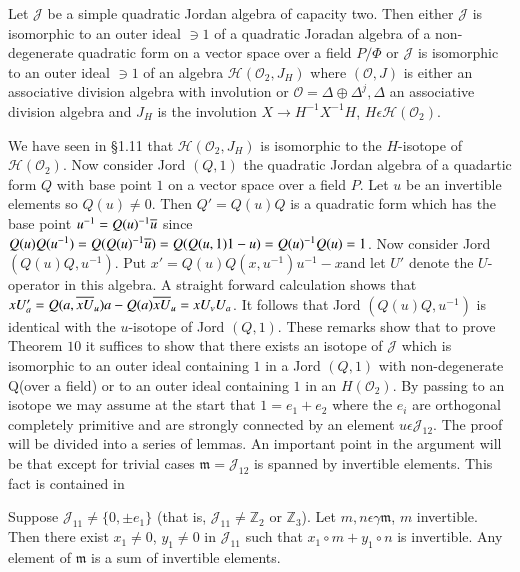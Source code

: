 \begin{thm}\label{c3:thm10}
Let $\mathscr{J}$ be a simple quadratic Jordan algebra of capacity
two. Then either $\mathscr{J}$ is isomorphic to an outer ideal $\ni 1$
of  a quadratic Joradan algebra of a non-degenerate quadratic form on
a vector space over a field $P/\Phi$ or $\mathscr{J}$ is isomorphic to
an outer ideal $\ni 1$ of an algebra $\mathscr{H}(\mathscr{O}_2,J_H)$
where $(\mathscr{O},J)$ is either an associative division algebra with
involution or $\mathscr{O}=\Delta\oplus \Delta^{j},\Delta$ an
associative division algebra and $J_H$ is the involution $X\to
H^{-1}X^{-1}H$, $H\epsilon\mathscr{H}(\mathscr{O}_2)$. 

We have seen in \S 1.11 that $\mathscr{H}(\mathscr{O}_2,J_H)$ is
isomorphic to the $H$-isotope of $\mathscr{H}(\mathscr{O}_2)$. Now
consider Jord $(Q,1)$ the quadratic Jordan algebra of a quadartic form
$Q $ with base point $1$ on a vector space over a field $P$. Let $u$
be an invertible elements so $Q(u)\neq 0$. Then $Q'=Q(u)Q$ is a
quadratic form which has the base point $u^{-1}=Q(u)^{-1}\overline{u}$ since
$Q(u)Q(u^{-1})=Q(Q(u)^{-1}\overline{u})=Q(Q(u,1)1-u)=Q(u)^{-1}Q(u)=1$. Now
consider Jord $(Q(u)Q,u^{-1})$. Put
$x'=Q(u)Q(x,u^{-1})u^{-1}-x$\pageoriginale and let $U'$ denote the
$U$-operator in this algebra. A straight forward calculation shows
that $xU'_a=Q(a,\overline{xU}_u)a-Q(a)\overline{xU}_u=xU_vU_a$. It follows that
Jord $(Q(u)Q,u^{-1})$ is identical with the $u$-isotope of Jord
$(Q,1)$. These remarks show that to prove Theorem $10$ it suffices to
show that there exists an isotope of $\mathscr{J}$ which is isomorphic
to an outer ideal containing $1$ in a Jord $(Q,1)$ with non-degenerate
Q(over a field) or to an outer ideal containing $1$ in an
$H(\mathscr{O}_2)$. By passing to an isotope we may assume at the
start that $1=e_1+e_2$ where the $e_i$ are orthogonal completely
primitive and are strongly connected by an element $u\epsilon
\mathscr{J}_{12}$. The proof will be divided into a series of
lemmas. An important point in the argument will be that except for
trivial cases $\mathfrak{m}=\mathscr{J}_{12}$ is spanned by invertible
elements. This fact is contained in 
\end{thm}

\setcounter{lemma}{0}
\begin{lemma}\label{c3:sec9:lem1}
  Suppose $\mathscr{J}_{11}\neq \{0, \pm e_1\}$ (that is,
  $\mathscr{J}_{11}\neq \mathbb{Z}_2$ or $\mathbb{Z}_3$). Let
  $m,n\epsilon \gamma \mathfrak{m}$, $m$ invertible. Then there exist
  $x_1\neq 0$, $y_1\neq 0$ in $\mathscr{J}_{11}$ such that $x_1\circ
  m+y_1\circ n$ is invertible. Any element of $\mathfrak{m}$ is a sum of
  invertible elements.
\end{lemma}

